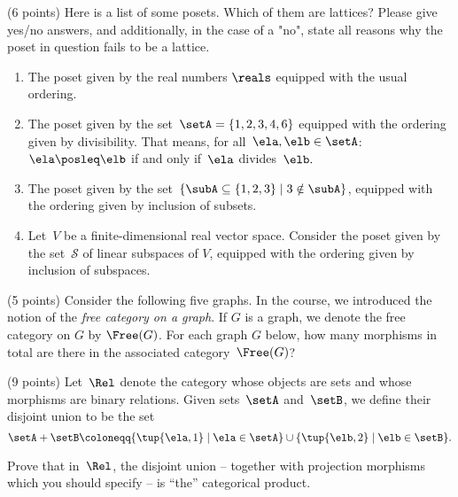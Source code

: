 \documentclass[paper=8.125in:10.250in,pagesize=pdftex,
    headinclude=false,footinclude=false,oneside,egregdoesnotlikesansseriftitles]{kaobook}
\begin{document}
\begin{gradedexercise}\label{ex:LatticeCheck}
(6 points) Here is a list of some posets. Which of them are lattices?
Please give yes/no answers, and additionally, in the case of a "no", state all reasons why the poset in question fails to be a lattice.
\begin{enumerate}
\item The poset given by the real numbers $\reals$ equipped with the usual ordering.
\item The poset given by the set~$\setA = \{ 1, 2, 3, 4, 6\}$ equipped with the ordering given by divisibility.
That means, for all~$\ela, \elb \in \setA$: $\ela \posleq \elb$ if and only if~$\ela$ divides~$\elb.$
\item The poset given by the set~$\{ \subA \subseteq \{1, 2 , 3 \} \mid 3 \notin \subA \}$, equipped with the ordering given by inclusion of subsets.
\item Let~$V$ be a finite-dimensional real vector space. Consider the poset given by the set~$\mathcal{S}$ of linear subspaces of $V$, equipped with the ordering given by inclusion of subspaces.
\end{enumerate}
\end{gradedexercise}


\newpage

\begin{gradedexercise}\label{ex:FreeCatOnGraph}
(5 points) Consider the following five graphs. In the course, we introduced the notion of the \emph{free category on a graph}. If $G$ is a graph, we denote the free category on $G$ by $\Free(G)$. For each graph $G$ below, how many morphisms in total are there in the associated category~$\Free(G)$?

  \begin{center}
  \end{center}
\end{gradedexercise}


\newpage


\begin{gradedexercise}\label{ex:DirectSumProd}
(9 points) Let~$\Rel$ denote the category whose objects are sets and whose morphisms are binary relations.
Given sets~$\setA$ and~$\setB$, we define their disjoint union to be the set
\begin{equation*}
\setA + \setB \coloneqq \{ \tup{\ela, 1} \mid \ela \in \setA \} \cup \{ \tup{\elb, 2} \mid \elb \in \setB \}.
\end{equation*}

Prove that in~$\Rel$, the disjoint union -- together with projection morphisms which you should specify -- is ``the'' categorical product.
\end{gradedexercise}
\end{document}
